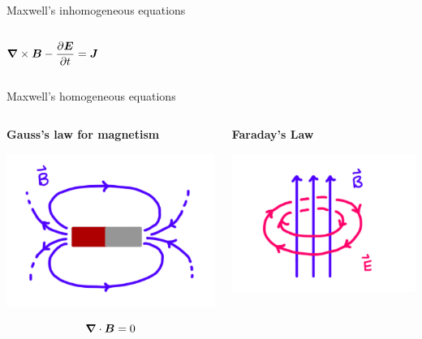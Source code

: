 \documentclass[aspectratio=169]{beamer}
\begin{document}
\begin{frame}{Maxwell's inhomogeneous equations}
\begin{columns}[c]
\begin{center}
    \vspace{-10mm}
    
    \small
    $$ \boldsymbol{\nabla} \times \boldsymbol{B} - \frac{\partial \boldsymbol{E}}{\partial t} = \boldsymbol{J} $$
    
    
    \end{center}
   
    
    \end{columns}
    
    
\end{frame}

\begin{frame}{Maxwell's homogeneous equations}
    \begin{columns}[c] 

    
    \begin{center} \textbf{Gauss's law for magnetism}
    
    
    \includegraphics[scale=.55]{figures/gauss_ii.png}
    
    \vspace{-10mm}
    
    $$ \boldsymbol{\nabla} \cdot \boldsymbol{B} = 0 $$
    
    \end{center}
    
    
    \begin{center}
    
    \textbf{Faraday's Law}
    
    \includegraphics[scale=.6]{figures/faraday.png}
    

\end{center}
\end{columns}
\end{frame}
\end{document}
